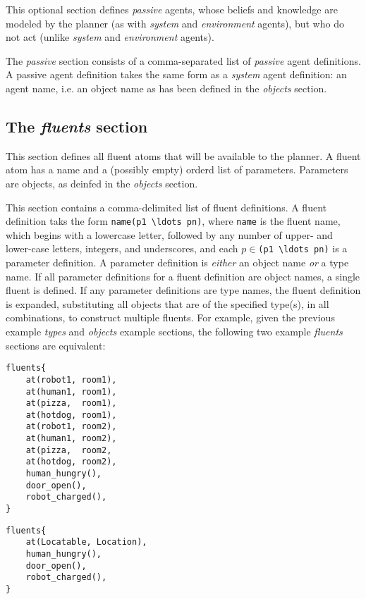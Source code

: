 \documentclass{article}
\begin{document}
This optional section defines \emph{passive} agents, whose beliefs and knowledge are
modeled by the planner (as with \emph{system} and \emph{environment} agents), but
who do not act (unlike \emph{system} and \emph{environment} agents).

The \emph{passive} section consists of a comma-separated list of \emph{passive} agent
definitions. A passive agent definition takes the same form as a \emph{system}
agent definition: an agent name, i.e. an object name as has been defined in the
\emph{objects} section.


\subsection{The \emph{fluents} section}

This section defines all fluent atoms that will be available to the planner. A
fluent atom has a name and a (possibly empty) orderd list of parameters. Parameters are
objects, as deinfed in the \emph{objects} section.

This section contains a comma-delimited list of fluent definitions. A fluent
definition taks the form \verb|name(p1 \ldots pn)|, where \verb|name| is the
fluent name, which begins with a lowercase letter, followed by any number of
upper- and lower-case letters, integers, and underscores, and each
$p\in$\verb|(p1 \ldots pn)| is a parameter definition. A parameter definition is
\emph{either} an object name \emph{or} a type name. If all parameter definitions
for a fluent definition are object names, a single fluent is defined. If any
parameter definitions are type names, the fluent definition is expanded,
substituting all objects that are of the specified type(s), in all combinations, to
construct multiple fluents. For example, given the previous example \emph{types}
and \emph{objects} example sections, the following two example
\emph{fluents} sections are equivalent:

\begin{verbatim}
fluents{
    at(robot1, room1),
    at(human1, room1),
    at(pizza,  room1),
    at(hotdog, room1),
    at(robot1, room2),
    at(human1, room2),
    at(pizza,  room2,
    at(hotdog, room2),
    human_hungry(),
    door_open(),
    robot_charged(),
}
\end{verbatim}

\begin{verbatim}
fluents{
    at(Locatable, Location),
    human_hungry(),
    door_open(),
    robot_charged(),
}
\end{verbatim}
\end{document}
